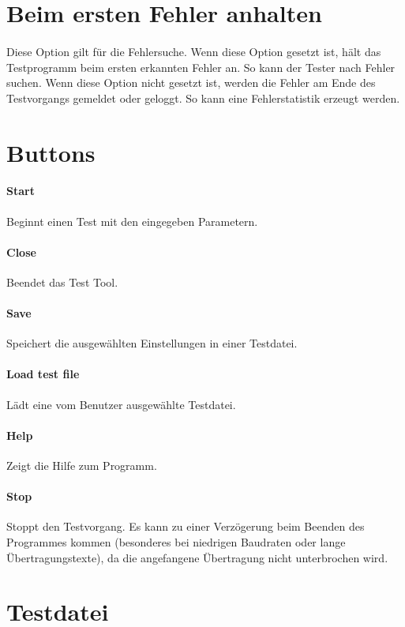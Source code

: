 \section{Beim ersten Fehler anhalten}
\paragraph{}
Diese Option gilt für die Fehlersuche. Wenn diese Option gesetzt ist, hält das Testprogramm beim ersten erkannten Fehler an. So kann der Tester nach Fehler suchen. Wenn diese Option nicht gesetzt ist, werden die Fehler am Ende des Testvorgangs gemeldet oder geloggt. So kann eine Fehlerstatistik erzeugt werden.


\section{Buttons}
\paragraph{Start} Beginnt einen Test mit den eingegeben Parametern.
\paragraph{Close} Beendet das Test Tool.
\paragraph{Save} Speichert die ausgewählten Einstellungen in einer Testdatei.
\paragraph{Load test file} Lädt eine vom Benutzer ausgewählte Testdatei.
\paragraph{Help} Zeigt die Hilfe zum Programm.
\paragraph{Stop} Stoppt den Testvorgang. Es kann zu einer Verzögerung beim Beenden des Programmes kommen (besonderes bei niedrigen Baudraten oder lange Übertragungstexte), da die angefangene Übertragung nicht unterbrochen wird.



\section{Testdatei}
